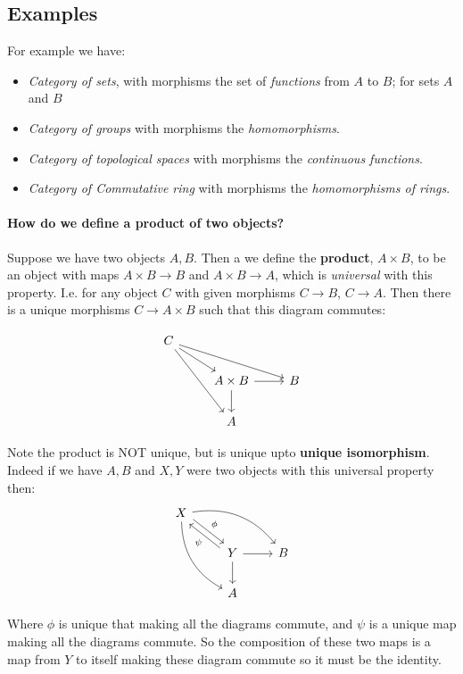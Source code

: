 \subsection{Examples}

For example we have:\begin{itemize}
    \item \textit{Category of sets}, with morphisms the set of \textit{functions} from $A$ to $B$; for sets $A$ and $B$
    \item \textit{Category of groups} with morphisms the \textit{homomorphisms}.
    \item \textit{Category of topological spaces} with morphisms the \textit{continuous functions}.
    \item \textit{Category of Commutative ring} with morphisms the \textit{homomorphisms of rings}.
\end{itemize}

\paragraph*{How do we define a product of two objects?}

\begin{definition}
    Suppose we have two objects $A,B$. Then a we define the \textbf{product}, $A\times B$, to be an object with maps $A\times B\rightarrow B$ and $A\times B\rightarrow A$, which is \textit{universal} with this property. I.e. for any object $C$ with given morphisms $C\rightarrow B$, $C\rightarrow A$. Then there is a unique morphisms $C\rightarrow A\times B$ such that this diagram commutes:

    \[\begin{tikzcd}
        C 
        \arrow[drr] 
        \arrow[dr]
        \arrow[ddr] & &\\
            & A\times B \arrow[r] \arrow[d] & B \\
         & A &
        \end{tikzcd}
        \]

Note the product is NOT unique, but is unique upto \textbf{unique isomorphism}. Indeed if we have $A, B$ and $X,Y$ were two objects with this universal property then:    \[\begin{tikzcd}
    X
    \arrow[drr, bend left] 
    \arrow[dr, "\phi", shift left]
    \arrow[ddr, bend right] & &\\
        & Y \arrow[r] \arrow[ul, "\psi", shift left] \arrow[d] & B \\
     & A &
    \end{tikzcd}
    \]

Where $\phi$ is unique that making all the diagrams commute, and $\psi$ is a unique map making all the diagrams commute. So the composition of these two maps is a map from $Y$ to itself making these diagram commute so it must be the identity. 
\end{definition}

